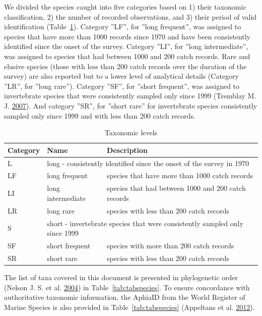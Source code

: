 \documentclass[12pt]{article}\usepackage[]{graphicx}\usepackage[]{color}
\begin{document}
We divided the species caught into five categories based on 1) their taxonomic classification, 2) the number of recorded observations, and 3) their period of valid identification (Table~\ref{tab:taxocat}). Category ''LF'', for ''long frequent'', was assigned to species that have more than 1000 records since 1970 and have been consistently identified since the onset of the survey. Category ''LI'', for ''long intermediate'', was assigned to species that had between 1000 and 200 catch records. Rare and elusive species (those with less than 200 catch records over the duration of the survey) are also reported but to a lower level of analytical details (Category ''LR'', for ''long rare''). Category ''SF'', for ''short frequent'', was assigned to invertebrate species that were consistently sampled only since 1999 (Tremblay M. J. \protect\hyperlink{ref-Tremblayetal:2007}{2007}). And category ''SR'', for ''short rare'' for invertebrate species consistently sampled only since 1999 and with less than 200 catch records.
\begin{table}
\begin{tabular}{p{}p{}p{}}
\toprule
\bfseries{Category} & \bfseries{Name} & \bfseries{Description} \\
\midrule
L & \multicolumn{2}{l}{long - consistently identified since the onset of the survey in 1970}\\
\midrule
LF & long frequent & species that have more than 1000 catch records \\

LI & long intermediate & species that had between 1000 and 200 catch records\\

LR & long rare & species with less than 200 catch records\\
\midrule
S & \multicolumn{2}{l}{short - invertebrate species that were consistently sampled only since 1999}\\
\midrule
SF & short frequent & species with more than 200 catch records \\

SR & short rare & species with less than 200 catch records\\
\bottomrule
\end{tabular}
\caption{Taxonomic levels}
\label{tab:taxocat}
\end{table}
The list of taxa covered in this document is presented in phylogenetic order (Nelson J. S. et al. \protect\hyperlink{ref-Nelsonetal:2004}{2004}) in Table~\ref{tab:tabspecies}. To ensure concordance with authoritative taxonomic information, the AphiaID from the World Register of Marine Species is also provided in Table~\ref{tab:tabspecies} (Appeltans et al. \protect\hyperlink{ref-WoRMS}{2012}).
\end{document}
